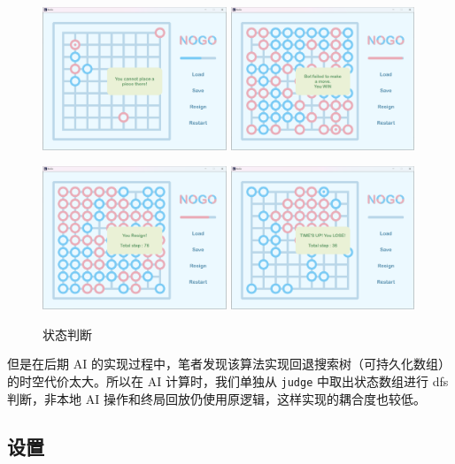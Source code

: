 \documentclass{noithesis}
\begin{document}
	\begin{figure}[htbp]
		\centering
		
		\includegraphics[width=5.5cm]{img/tip.png}	
		\includegraphics[width=5.5cm]{img/win.png}
		
		\includegraphics[width=5.5cm]{img/resign.png}
		\includegraphics[width=5.5cm]{img/TLE.png}
		
		\caption{状态判断}
	\end{figure}
	
	但是在后期 AI 的实现过程中，笔者发现该算法实现回退搜索树（可持久化数组）的时空代价太大。所以在 AI 计算时，我们单独从 \verb|judge| 中取出状态数组进行 dfs 判断，非本地 AI 操作和终局回放仍使用原逻辑，这样实现的耦合度也较低。
	
	\subsection{设置}
	
\end{document}
